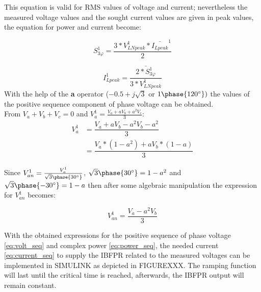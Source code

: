 This equation is valid for RMS values of voltage and current; nevertheless the measured voltage values and the sought current values are given in peak values, the equation for power and current become:

\begin{equation}
\label{eq:power_seq}
S_{3\varphi}^1=\dfrac{3*V_{LNpeak}^1*\bar{I_{Lpeak}}^1}{2}
\end{equation}




\begin{equation}
\label{eq:current_seq}
I_{Lpeak}^1=\dfrac{\bar{2*S_{3\varphi}^1}}{3*V_{LNpeak}^1}
\end{equation}
With the help of the \textbf{a} operator ($-0.5+j\sqrt{3}$ or $ 1\phase{120^{\circ}}) $ the values of the positive sequence component of phase voltage can be obtained. \\
From $ V_a +V_b+V_c=0$ and $ V_a^1=\frac{V_a+ aV_b+a^2 V_c}{3} $:
\begin{align*}
	 V_a^1 & =\dfrac{V_a+ aV_b-a^2 V_b-a^2}{3} \\
	& =\dfrac{V_a*(1-a^2)+ aV_b*(1-a)}{3}
\end{align*}

Since $V_{an}^1=\frac{V_a^1}{\sqrt{3}\phase{30^{\circ}}}$, $\sqrt{3}\phase{30^{\circ}}=1-a^2 $ and $ \sqrt{3}\phase{-30^{\circ}}=1-a $ then after some algebraic manipulation the expression for $ V_{an}^1 $ becomes:

\begin{equation}
	\label{eq:volt_seq}
	V_{an}^1=\dfrac{V_a-a^2 V_b}{3}
\end{equation}

With the obtained expressions  for the positive sequence of phase voltage \eqref{eq:volt_seq} and complex power \eqref{eq:power_seq}, the needed current \eqref{eq:current_seq} to supply the IBFPR related to the measured voltages can be implemented in SIMULINK as depicted in FIGUREXXX. The ramping function will last until the critical time is reached, afterwards, the IBFPR output will remain constant.

